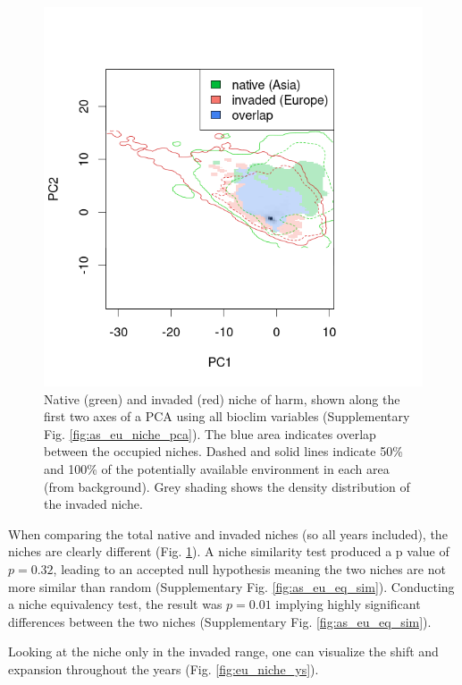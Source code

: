 \documentclass[12pt,a4paper]{article}
\begin{document}
\begin{figure}
    \centering
    \includegraphics[width = 0.6\linewidth]{"../../R/figures/as-eu-tot-niche.png"}
    \caption{\label{fig:as_eu_niche} Native (green) and invaded (red) niche of \gls{harm}, shown along the first two axes of a PCA using all bioclim variables (Supplementary Fig. \ref{fig:as_eu_niche_pca}). The blue area indicates overlap between the occupied niches. Dashed and solid lines indicate 50\% and 100\% of the potentially available environment in each area (from background). Grey shading shows the density distribution of the invaded niche.}
\end{figure}

When comparing the total native and invaded niches (so all years included), the niches are clearly different (Fig. \ref{fig:as_eu_niche}).
A niche similarity test produced a p value of $p = 0.32$, leading to an accepted null hypothesis meaning the two niches are not more similar than random (Supplementary Fig. \ref{fig:as_eu_eq_sim}).
Conducting a niche equivalency test, the result was $p = 0.01$ implying highly significant differences between the two niches (Supplementary Fig. \ref{fig:as_eu_eq_sim}).

Looking at the niche only in the invaded range, one can visualize the shift and expansion throughout the years (Fig. \ref{fig:eu_niche_ys}).
\end{document}
